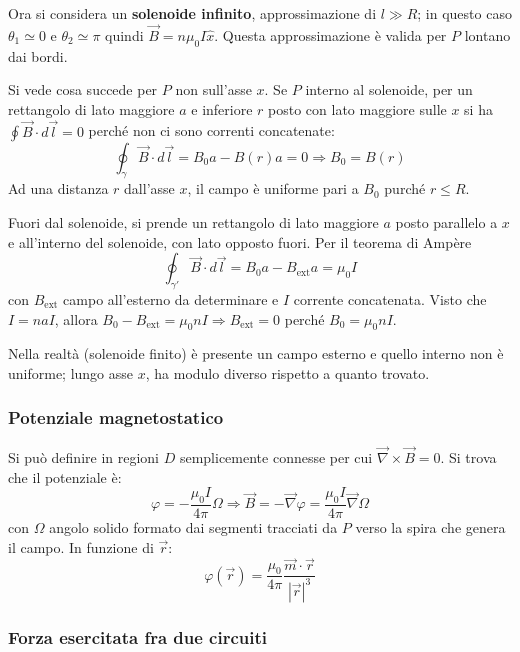 \documentclass[10pt, a4paper]{scrartcl}
\numberwithin{equation}{subsection}
\theoremstyle{style1}
\begin{document}
Ora si considera un \textbf{solenoide infinito}, approssimazione di $l \gg R$; in questo caso $\theta_1 \simeq 0$ e $\theta_2 \simeq \pi$ quindi $\vec{B} = n \mu_0 I \hat{x}$. Questa approssimazione \`e valida per $P$ lontano dai bordi.

Si vede cosa succede per $P$ non sull'asse $x$. Se $P$ interno al solenoide, per un rettangolo di lato maggiore $a$ e inferiore $r$ posto con lato maggiore sulle $x$ si ha $\oint \vec{B}\cdot d\vec{l}=0$ perch\'e non ci sono correnti concatenate:
\begin{equation}
	\oint_{\gamma} \vec{B}\cdot d\vec{l} = B_0 a - B(r) a = 0 \Rightarrow B_0 = B(r) 
\end{equation}
Ad una distanza $r$ dall'asse $x$, il campo \`e uniforme pari a $B_0$ purch\'e $r\le R$.

Fuori dal solenoide, si prende un rettangolo di lato maggiore $a$ posto parallelo a $x$ e all'interno del solenoide, con lato opposto fuori. Per il teorema di Amp\`ere
\begin{equation}
	\oint_{\gamma'}  \vec{B}\cdot d\vec{l} = B_0a - B_\text{ext}a = \mu_0 I 
\end{equation}
con $B_\text{ext}$ campo all'esterno da determinare e $I$ corrente concatenata. Visto che $I= naI$, allora $B_0 - B_\text{ext}=\mu_0 n I \Rightarrow B_\text{ext}=0$ perch\'e $B_0 = \mu_0 n I$. 

Nella realt\`a (solenoide finito) \`e presente un campo esterno e quello interno non \`e uniforme; lungo asse $x$, ha modulo diverso rispetto a quanto trovato.
\subsubsection{Potenziale magnetostatico}

Si pu\`o definire in regioni $D$ semplicemente connesse per cui $\vec{\nabla }\times \vec{B} = 0$. Si trova che il potenziale \`e:
\begin{equation}
	\varphi  = - \frac{\mu_0 I}{4 \pi }\Omega \Rightarrow \vec{B} = - \vec{\nabla }\varphi = \frac{\mu_0 I }{4 \pi } \vec{\nabla }\Omega 
\end{equation}
con $\Omega $ angolo solido formato dai segmenti tracciati da $P$ verso la spira che genera il campo. In funzione di $\vec{r}$:
\begin{equation}
	\varphi (\vec{r} ) = \frac{\mu_0}{4 \pi }\frac{\vec{m}\cdot \vec{r}}{\left\lvert \vec{r} \right\rvert ^3}
\end{equation}
\subsubsection{Forza esercitata fra due circuiti}
\end{document}
